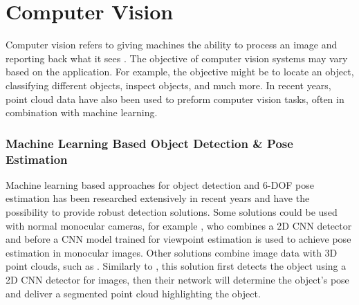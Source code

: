 

\section{Computer Vision} \label{sec:T:MachineVision}
Computer vision refers to giving machines the ability to process an image and reporting back what it sees \cite{SnyderWesleyE.2010Mv}. The objective of computer vision systems may vary based on the application. For example, the objective might be to locate an object, classifying different objects, inspect objects, and much more. In recent years, point cloud data have also been used to preform computer vision tasks, often in combination with machine learning.

\subsubsection{Machine Learning Based Object Detection \& Pose Estimation} \label{sec:T:MV:CNN-based}
Machine learning based approaches for object detection and 6-DOF pose estimation has been researched extensively in recent years and have the possibility to provide robust detection solutions. Some solutions could be used with normal monocular cameras, for example \cite{JosipKerzel2018}, who combines a 2D CNN detector and before a CNN model trained for viewpoint estimation is used to achieve pose estimation in monocular images. Other solutions combine image data with 3D point clouds, such as \cite{WeiDuan2020}. Similarly to \cite{JosipKerzel2018}, this solution first detects the object using a 2D CNN detector for images, then their network will determine the object's pose and deliver a segmented point cloud highlighting the object.

